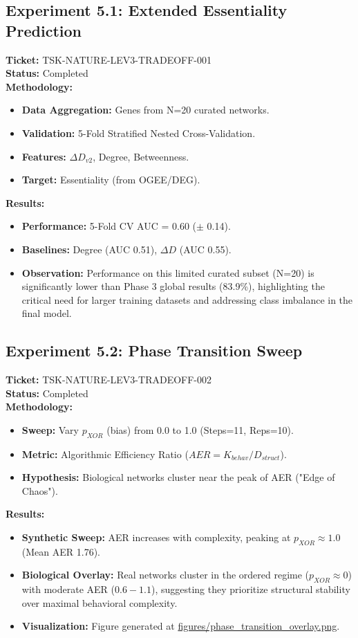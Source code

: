 \documentclass{article}
\begin{document}
\subsection{Experiment 5.1: Extended Essentiality Prediction}
\textbf{Ticket:} TSK-NATURE-LEV3-TRADEOFF-001 \\
\textbf{Status:} Completed \\
\textbf{Methodology:}
\begin{itemize}
    \item \textbf{Data Aggregation:} Genes from N=20 curated networks.
    \item \textbf{Validation:} 5-Fold Stratified Nested Cross-Validation.
    \item \textbf{Features:} $\Delta D_{v2}$, Degree, Betweenness.
    \item \textbf{Target:} Essentiality (from OGEE/DEG).
\end{itemize}
\textbf{Results:}
\begin{itemize}
    \item \textbf{Performance:} 5-Fold CV AUC = 0.60 ($\pm$ 0.14).
    \item \textbf{Baselines:} Degree (AUC 0.51), $\Delta D$ (AUC 0.55).
    \item \textbf{Observation:} Performance on this limited curated subset (N=20) is significantly lower than Phase 3 global results (83.9\%), highlighting the critical need for larger training datasets and addressing class imbalance in the final model.
\end{itemize}

\subsection{Experiment 5.2: Phase Transition Sweep}
\textbf{Ticket:} TSK-NATURE-LEV3-TRADEOFF-002 \\
\textbf{Status:} Completed \\
\textbf{Methodology:}
\begin{itemize}
    \item \textbf{Sweep:} Vary $p_{XOR}$ (bias) from 0.0 to 1.0 (Steps=11, Reps=10).
    \item \textbf{Metric:} Algorithmic Efficiency Ratio ($AER = K_{behav} / D_{struct}$).
    \item \textbf{Hypothesis:} Biological networks cluster near the peak of AER ("Edge of Chaos").
\end{itemize}
\textbf{Results:}
\begin{itemize}
    \item \textbf{Synthetic Sweep:} AER increases with complexity, peaking at $p_{XOR} \approx 1.0$ (Mean AER 1.76).
    \item \textbf{Biological Overlay:} Real networks cluster in the ordered regime ($p_{XOR} \approx 0$) with moderate AER ($0.6 - 1.1$), suggesting they prioritize structural stability over maximal behavioral complexity.
    \item \textbf{Visualization:} Figure generated at \url{figures/phase_transition_overlay.png}.
\end{itemize}
\end{document}
